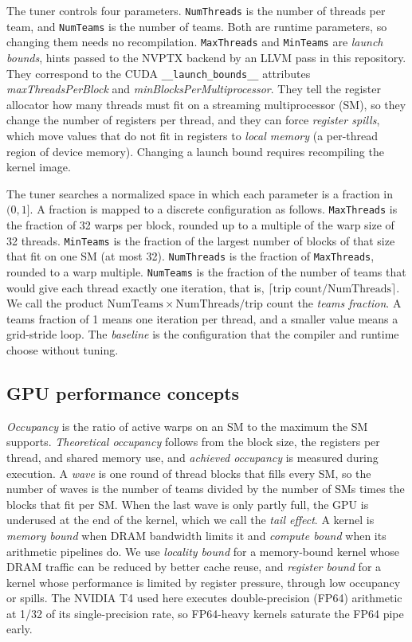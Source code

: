 \documentclass[10pt]{article}
\newcommand{\code}[1]{\texttt{#1}}
\begin{document}
The tuner controls four parameters. \code{NumThreads} is the number of
threads per team, and \code{NumTeams} is the number of teams. Both are runtime
parameters, so changing them needs no recompilation. \code{MaxThreads} and
\code{MinTeams} are \emph{launch bounds}, hints passed to the NVPTX backend
by an LLVM pass in this repository. They correspond to the CUDA
\code{\_\_launch\_bounds\_\_} attributes \emph{maxThreadsPerBlock} and
\emph{minBlocksPerMultiprocessor}. They tell the register allocator how many
threads must fit on a streaming multiprocessor (SM), so they change the
number of registers per thread, and they can force \emph{register spills},
which move values that do not fit in registers to \emph{local memory} (a
per-thread region of device memory). Changing a launch bound requires
recompiling the kernel image.

The tuner searches a normalized space in which each parameter is a fraction
in $(0, 1]$. A fraction is mapped to a discrete configuration as follows.
\code{MaxThreads} is the fraction of 32 warps per block, rounded up to a
multiple of the warp size of 32 threads. \code{MinTeams} is the fraction of
the largest number of blocks of that size that fit on one SM (at most 32).
\code{NumThreads} is the fraction of \code{MaxThreads}, rounded to a warp
multiple. \code{NumTeams} is the fraction of the number of teams that would
give each thread exactly one iteration, that is,
$\lceil \text{trip count} / \text{NumThreads} \rceil$. We call the product
$\text{NumTeams} \times \text{NumThreads} / \text{trip count}$ the
\emph{teams fraction}. A teams fraction of 1 means one iteration per thread,
and a smaller value means a grid-stride loop. The \emph{baseline} is the
configuration that the compiler and runtime choose without tuning.

\subsection{GPU performance concepts}
\emph{Occupancy} is the ratio of active warps on an SM to the maximum the SM
supports. \emph{Theoretical occupancy} follows from the block size, the
registers per thread, and shared memory use, and \emph{achieved occupancy}
is measured during execution. A \emph{wave} is one round of thread blocks
that fills every SM, so the number of waves is the number of teams divided
by the number of SMs times the blocks that fit per SM. When the last wave is
only partly full, the GPU is underused at the end of the kernel, which we
call the \emph{tail effect}. A kernel is \emph{memory bound} when DRAM
bandwidth limits it and \emph{compute bound} when its arithmetic pipelines
do. We use \emph{locality bound} for a memory-bound kernel whose DRAM traffic
can be reduced by better cache reuse, and \emph{register bound} for a kernel
whose performance is limited by register pressure, through low occupancy or
spills. The NVIDIA T4 used here executes double-precision (FP64) arithmetic
at 1/32 of its single-precision rate, so FP64-heavy kernels saturate the FP64
pipe early.
\end{document}
